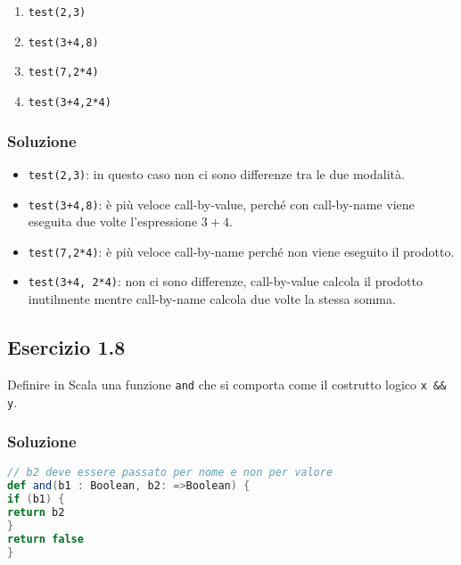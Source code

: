 \begin{enumerate}
	\item \texttt{test(2,3)}
	\item \texttt{test(3+4,8)}
	\item \texttt{test(7,2*4)}
	\item \texttt{test(3+4,2*4)}
\end{enumerate}

\subsubsection{Soluzione}

\begin{itemize}
	\item \texttt{test(2,3)}: in questo caso non ci sono differenze tra le due modalità.
	\item \texttt{test(3+4,8)}: è più veloce call-by-value, perché con call-by-name viene eseguita due volte l'espressione $3+4$.
	\item \texttt{test(7,2*4)}: è più veloce call-by-name perché non viene eseguito il prodotto.
	\item \texttt{test(3+4, 2*4)}: non ci sono differenze, call-by-value calcola il prodotto inutilmente mentre call-by-name calcola due volte la stessa somma.
\end{itemize}


\subsection{Esercizio 1.8}

Definire in Scala una funzione \texttt{and} che si comporta come il costrutto logico \texttt{x \&\& y}.

\subsubsection{Soluzione}

\begin{lstlisting}[language=Scala]
// b2 deve essere passato per nome e non per valore
def and(b1 : Boolean, b2: =>Boolean) {
if (b1) {
return b2
}
return false
}
\end{lstlisting}